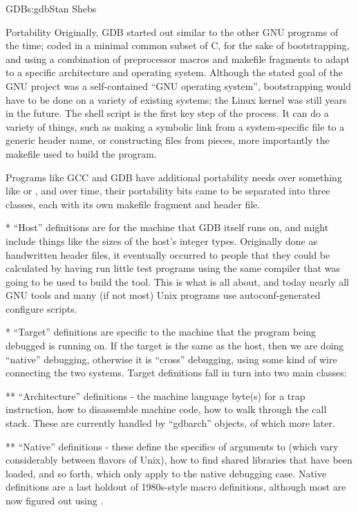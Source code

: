 \begin{aosachapter}{GDB}{s:gdb}{Stan Shebs}
\begin{aosasect1}{Portability}
Originally, GDB started out similar to the other GNU programs of the
time; coded in a minimal common subset of C, for the sake of
bootstrapping, and using a combination of preprocessor macros and
makefile fragments to adapt to a specific architecture and operating
system.  Although the stated goal of the GNU project was a
self-contained ``GNU operating system'', bootstrapping would have to
be done on a variety of existing systems; the Linux kernel was still
years in the future.  The  shell script is the first
key step of the process.  It can do a variety of things, such as
making a symbolic link from a system-specific file to a generic header
name, or constructing files from pieces, more importantly the makefile
used to build the program.

Programs like GCC and GDB have additional portability needs over
something like  or , and over time, their
portability bits came to be separated into three classes, each with
its own makefile fragment and header file.

* ``Host'' definitions are for the machine that GDB itself runs on,
and might include things like the sizes of the host's integer types.
Originally done as handwritten header files, it eventually occurred to
people that they could be calculated by having  run
little test programs using the same compiler that was going to be used
to build the tool.  This is what  is all about, and
today nearly all GNU tools and many (if not most) Unix programs use
autoconf-generated configure scripts.

* ``Target'' definitions are specific to the machine that the program
being debugged is running on.  If the target is the same as the host,
then we are doing ``native'' debugging, otherwise it is ``cross''
debugging, using some kind of wire connecting the two systems.  Target
definitions fall in turn into two main classes:

** ``Architecture'' definitions - the machine language byte(s) for a
trap instruction, how to disassemble machine code, how to walk
through the call stack.  These are currently handled by ``gdbarch''
objects, of which more later.

** ``Native'' definitions - these define the specifics of arguments to
 (which vary considerably between flavors of Unix), how
to find shared libraries that have been loaded, and so forth, which
only apply to the native debugging case.  Native definitions are a
last holdout of 1980s-style macro definitions, although most are now
figured out using .


\end{aosasect1}
\end{aosachapter}
